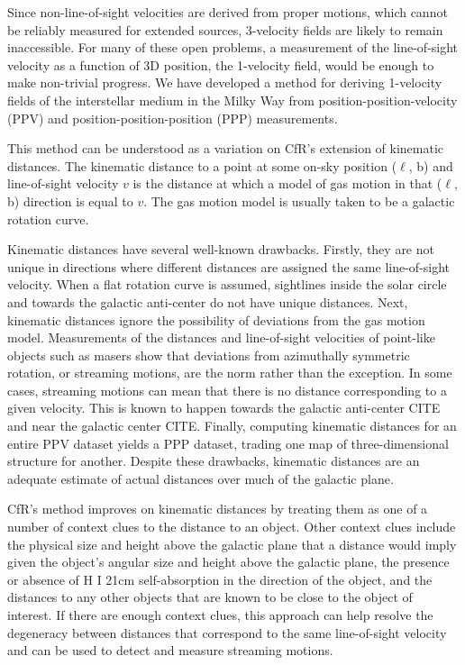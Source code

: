 Since non-line-of-sight velocities are derived from proper motions, which cannot be reliably measured for extended sources, 3-velocity fields are likely to remain inaccessible. 
For many of these open problems, a measurement of the line-of-sight velocity as a function of 3D position, the 1-velocity field, would be enough to make non-trivial progress. 
We have developed a method for deriving 1-velocity fields of the interstellar medium in the Milky Way from position-position-velocity (PPV) and position-position-position (PPP) measurements. 

This method can be understood as a variation on CfR's extension of kinematic distances.
The kinematic distance to a point at some on-sky position ($\ell$, b) and line-of-sight velocity $v$ is the distance at which a model of gas motion in that ($\ell$, b) direction is equal to $v$.
The gas motion model is usually taken to be a galactic rotation curve. 

Kinematic distances have several well-known drawbacks.
Firstly, they are not unique in directions where different distances are assigned the same line-of-sight velocity.
When a flat rotation curve is assumed, sightlines inside the solar circle and towards the galactic anti-center do not have unique distances. 
Next, kinematic distances ignore the possibility of deviations from the gas motion model.
Measurements of the distances and line-of-sight velocities of point-like objects such as masers show that deviations from azimuthally symmetric rotation, or streaming motions, are the norm rather than the exception.
In some cases, streaming motions can mean that there is no distance corresponding to a given velocity. 
This is known to happen towards the galactic anti-center CITE and near the galactic center CITE.
Finally, computing kinematic distances for an entire PPV dataset yields a PPP dataset, trading one map of three-dimensional structure for another.
Despite these drawbacks, kinematic distances are an adequate estimate of actual distances over much of the galactic plane.

CfR's method improves on kinematic distances by treating them as one of a number of context clues to the distance to an object.
Other context clues include the physical size and height above the galactic plane that a distance would imply given the object's angular size and height above the galactic plane, the presence or absence of H I 21cm self-absorption in the direction of the object, and the distances to any other objects that are known to be close to the object of interest.
If there are enough context clues, this approach can help resolve the degeneracy between distances that correspond to the same line-of-sight velocity and can be used to detect and measure streaming motions.

